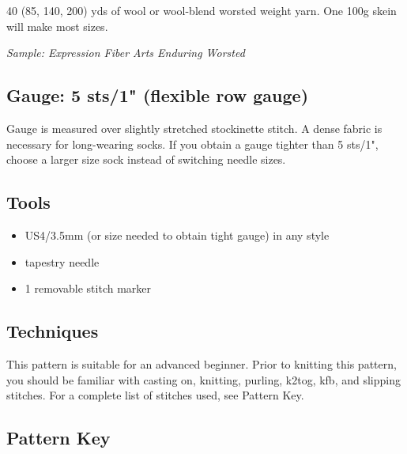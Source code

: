 \documentclass[12pt]{article}
\begin{document}
\begin{multicols}{2}
40 (85, 140, 200) yds of wool or wool-blend worsted weight yarn. One 100g skein will make most sizes.

\emph{Sample: Expression Fiber Arts Enduring Worsted}

\subsection*{Gauge: 5 sts/1" (flexible row gauge)}

Gauge is measured over slightly stretched stockinette stitch. A dense fabric is necessary for long-wearing socks. If you obtain a gauge tighter than 5 sts/1", choose a larger size sock instead of switching needle sizes.

\vfill
\columnbreak
\subsection*{Tools}

\begin{itemize}
\item US4/3.5mm (or size needed to obtain tight gauge) in any style %
\item tapestry needle
\item 1 removable stitch marker%
\end{itemize}

\subsection*{Techniques}

This pattern is suitable for an advanced beginner. %
Prior to knitting this pattern, you should be familiar with casting on, knitting, purling, k2tog, kfb, and slipping stitches. %
For a complete list of stitches used, see Pattern Key.


\subsection*{Pattern Key}


\end{multicols}
\end{document}
